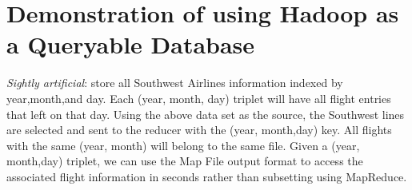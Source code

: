 \documentclass[letterpaper,10pt,english]{sphinxmanual}
\begin{document}
\section{Demonstration of using Hadoop as a Queryable Database}
\label{airline:demonstration-of-using-hadoop-as-a-queryable-database}
\emph{Sightly artificial}: store all Southwest Airlines information indexed by
year,month,and day. Each (year, month, day) triplet will have all flight entries
that left on that day. Using the above data set as the source, the Southwest
lines are selected and sent to the reducer with the (year, month,day) key. All
flights with the same (year, month) will belong to the same file. Given a (year,
month,day) triplet, we can use the Map File output format to access the
associated flight information in seconds rather than subsetting using MapReduce.
\end{document}
